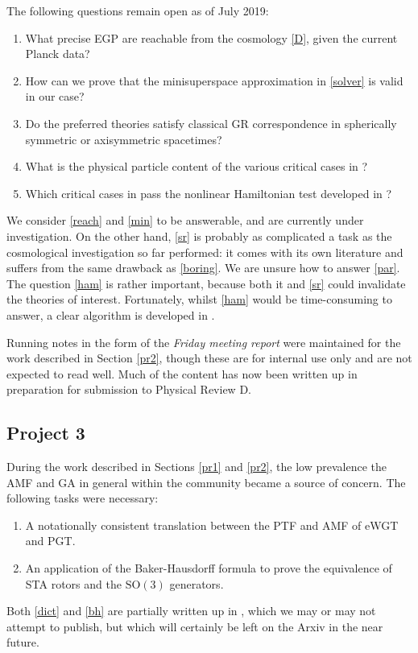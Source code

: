 \documentclass[twoside]{report}
\begin{document}
\begin{multicols}{2}
The following questions remain open as of July 2019:
\begin{enumerate}[resume]
  \item\label{reach} What precise EGP are reachable from the cosmology \ref{D}, given the current Planck data?
  \item\label{min} How can we prove that the minisuperspace approximation in \ref{solver} is valid in our case?
  \item\label{sr} Do the preferred theories satisfy classical GR correspondence in spherically symmetric or axisymmetric spacetimes?
  \item\label{par} What is the physical particle content of the various critical cases in \cite{2019PhRvD..99f4001L,Lin2}?
  \item\label{ham} Which critical cases in \cite{2019PhRvD..99f4001L,Lin2} pass the nonlinear Hamiltonian test developed in \cite{1999IJMPD...8..459Y,2002IJMPD..11..747Y}?
\end{enumerate}
We consider \ref{reach} and \ref{min} to be answerable, and are currently under investigation. On the other hand, \ref{sr} is probably as complicated a task as the cosmological investigation so far performed: it comes with its own literature and suffers from the same drawback as \ref{boring}. We are unsure how to answer \ref{par}. The question \ref{ham} is rather important, because both it and \ref{sr} could invalidate the theories of interest. Fortunately, whilst \ref{ham} would be time-consuming to answer, a clear algorithm is developed in \cite{1999IJMPD...8..459Y,2002IJMPD..11..747Y}.

Running notes in the form of the \textit{Friday meeting report} \cite{fmr} were maintained for the work described in Section \ref{pr2}, though these are for internal use only and are not expected to read well. Much of the content has now been written up \cite{paper-2} in preparation for submission to Physical Review D.
\subsection{Project 3}\label{pr3}
During the work described in Sections \ref{pr1} and \ref{pr2}, the low prevalence the AMF and GA in general within the community became a source of concern. The following tasks were necessary:
\begin{enumerate}[resume]
  \item\label{dict} A notationally consistent translation between the PTF and AMF of eWGT and PGT.
  \item\label{bh} An application of the Baker-Hausdorff formula to prove the equivalence of STA rotors and the $\mathrm{SO}(3)$ generators.
\end{enumerate}
Both \ref{dict} and \ref{bh} are partially written up in \cite{dictionary}, which we may or may not attempt to publish, but which will certainly be left on the Arxiv in the near future.

\end{multicols}
\end{document}
